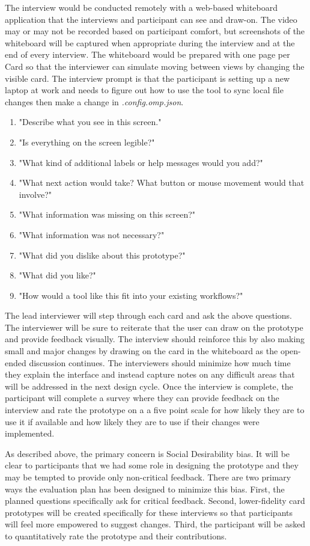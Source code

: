 \documentclass[letterpaper]{jdf}
\begin{document}
The interview would be conducted remotely with a web-based whiteboard application that the interviews and participant can see and draw-on.  The video may or may not be recorded based on participant comfort, but screenshots of the whiteboard will be captured when appropriate during the interview and at the end of every interview. The whiteboard would be prepared with one page per Card so that the interviewer can simulate moving between views by changing the visible card. The interview prompt is that the participant is setting up a new laptop at work and needs to figure out how to use the tool to sync local file changes then make a change in \emph{.config.omp.json}.

\begin{enumerate}
	\item "Describe what you see in this screen."
	\item "Is everything on the screen legible?"
	\item "What kind of additional labels or help messages would you add?"
	\item "What next action would take? What button or mouse movement would that involve?"
	\item "What information was missing on this screen?"
	\item "What information was not necessary?"
	\item "What did you dislike about this prototype?"
	\item "What did you like?"
	\item "How would a tool like this fit into your existing workflows?"
\end{enumerate}

The lead interviewer will step through each card and ask the above questions. The interviewer will be sure to reiterate that the user can draw on the prototype and provide feedback visually. The interview should reinforce this by also making small and major changes by drawing on the card in the whiteboard as the open-ended discussion continues. The interviewers should minimize how much time they explain the interface and instead capture notes on any difficult areas that will be addressed in the next design cycle. Once the interview is complete, the participant will complete a survey where they can provide feedback on the interview and rate the prototype on a a five point scale for how likely they are to use it if available and how likely they are to use if their changes were implemented.

 As described above, the primary concern is Social Desirability bias. It will be clear to participants that we had some role in designing the prototype and they may be tempted to provide only non-critical feedback. There are two primary ways the evaluation plan has been designed to minimize this bias. First, the planned questions specifically ask for critical feedback. Second, lower-fidelity card prototypes will be created specifically for these interviews so that participants will feel more empowered to suggest changes. Third, the participant will be asked to quantitatively rate the prototype and their contributions.
\end{document}
